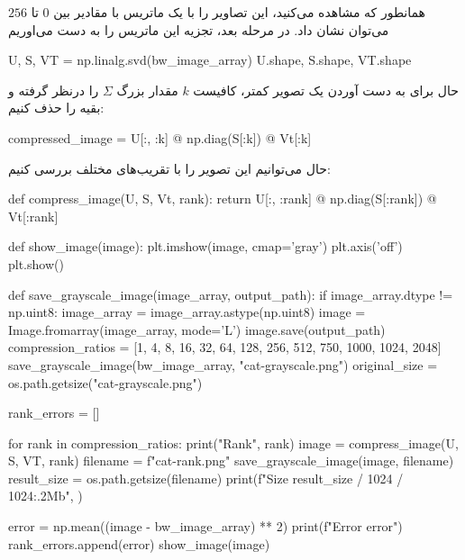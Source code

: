 همانطور که مشاهده می‌کنید، این تصاویر را با یک ماتریس با مقادیر بین
$0$
تا
$256$
می‌توان نشان داد. در مرحله بعد، تجزیه
این ماتریس را به دست ‌می‌اوریم


\begin{latin}
  \begin{python}
U, S, VT = np.linalg.svd(bw_image_array)
U.shape, S.shape, VT.shape
  \end{python}
\end{latin}

حال برای به دست آوردن یک تصویر کمتر، کافیست
$k$
مقدار بزرگ
$\Sigma$
را درنظر گرفته و بقیه را حذف کنیم:


\begin{latin}
  \begin{python}
compressed_image = U[:, :k] @ np.diag(S[:k]) @ Vt[:k]
  \end{python}
\end{latin}

حال می‌توانیم این تصویر را با تقریب‌های مختلف بررسی کنیم:


\begin{latin}
  \begin{python}
def compress_image(U, S, Vt, rank):
    return U[:, :rank] @ np.diag(S[:rank]) @ Vt[:rank]

def show_image(image):
    plt.imshow(image, cmap='gray')
    plt.axis('off')
    plt.show()

def save_grayscale_image(image_array, output_path):
    if image_array.dtype != np.uint8:
        image_array = image_array.astype(np.uint8)
    image = Image.fromarray(image_array, mode='L')
    image.save(output_path)
compression_ratios = [1, 4, 8, 16, 32, 64, 128, 256, 512, 750, 1000, 1024, 2048]
save_grayscale_image(bw_image_array, "cat-grayscale.png")
original_size = os.path.getsize("cat-grayscale.png")

rank_errors = []

for rank in compression_ratios:
    print("Rank", rank)
    image = compress_image(U, S, VT, rank)
    filename = f"cat-{rank}.png"
    save_grayscale_image(image, filename)
    result_size = os.path.getsize(filename)
    print(f"Size {result_size / 1024 / 1024:.2}Mb", )

    error = np.mean((image - bw_image_array) ** 2)
    print(f"Error {error}")
    rank_errors.append(error)
    show_image(image)


  \end{python}
\end{latin}

